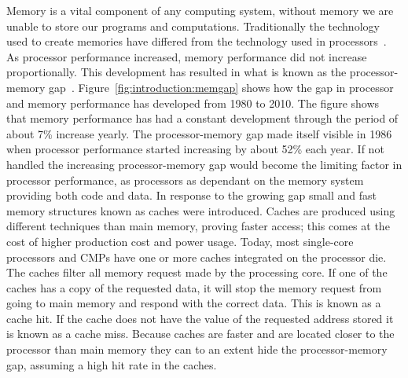 Memory is a vital component of any computing system, without memory we are unable to store our programs and computations.
Traditionally the technology used to create memories have differed from the technology used in processors~\cite{Wilkes2001}.
As processor performance increased, memory performance did not increase proportionally.
This development has resulted in what is known as the processor-memory gap~\cite{Wilkes2001}.
Figure~\ref{fig:introduction:memgap} shows how the gap in processor and memory performance has developed from 1980 to 2010.
The figure shows that memory performance has had a constant development through the period of about 7\% increase yearly.
The processor-memory gap made itself visible in 1986 when processor performance started increasing by about 52\% each year.
If not handled the increasing processor-memory gap would become the limiting factor in processor performance, as processors as dependant on the memory system providing both code and data.
In response to the growing gap small and fast memory structures known as caches were introduced.
Caches are produced using different techniques than main memory, proving faster access; this comes at the cost of higher production cost and power usage.
Today, most single-core processors and CMPs have one or more caches integrated on the processor die.
The caches filter all memory request made by the processing core.
If one of the caches has a copy of the requested data, it will stop the memory request from going to main memory and respond with the correct data.
This is known as a cache hit.
If the cache does not have the value of the requested address stored it is known as a cache miss.
Because caches are faster and are located closer to the processor than main memory they can to an extent hide the processor-memory gap, assuming a high hit rate in the caches.


